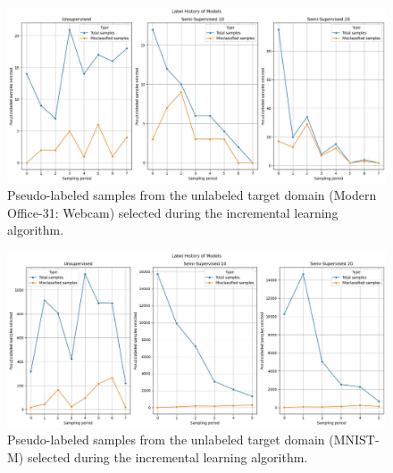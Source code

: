 \documentclass{article}
\begin{document}
	\begin{figure}
		\centering
		\includegraphics[width=12cm]{"office_misclassifications.jpeg"}
		\caption{Pseudo-labeled samples from the unlabeled target domain (Modern Office-31: Webcam) selected during the incremental learning algorithm.}
		\label{fig::office_misclassifications}
	\end{figure}

	\begin{figure}
		\centering
		\includegraphics[width=12cm]{"mnist_misclassifications.jpeg"}
		\caption{Pseudo-labeled samples from the unlabeled target domain (MNIST-M) selected during the incremental learning algorithm.}
		\label{fig::mnist_misclassifications}
	\end{figure}
	
	
	\printbibliography
\end{document}
